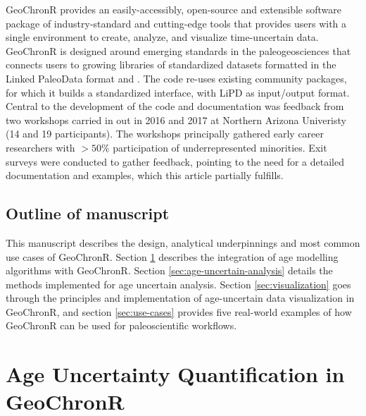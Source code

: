 \documentclass[gchron, manuscript]{copernicus}
\begin{document}
GeoChronR provides an easily-accessibly, open-source and extensible software package of industry-standard and cutting-edge tools that provides users with a single environment to create, analyze, and visualize time-uncertain data.
GeoChronR is designed around emerging standards in the paleogeosciences that connects users to growing libraries of standardized datasets formatted in the Linked PaleoData format \citep{LiPD} and \citep{neotoma}. The code re-uses existing community packages, for which it builds a standardized interface, with LiPD as input/output format. Central to the development of the code and documentation was feedback from two workshops carried in out in 2016 and 2017 at Northern Arizona Univeristy (14 and 19 participants). The workshops principally gathered early career researchers with \(>50\%\) participation of underrepresented minorities. Exit surveys were conducted to gather feedback, pointing to the need for a detailed documentation and examples, which this article partially fulfills.

\subsection{Outline of manuscript}

This manuscript describes the design, analytical underpinnings and most common use cases of GeoChronR.
Section \ref{sec:age-modeling} describes the integration of age modelling algorithms with GeoChronR.
Section \ref{sec:age-uncertain-analysis} details the methods implemented for age uncertain analysis.
Section \ref{sec:visualization} goes through the principles and implementation of age-uncertain data visualization in GeoChronR, and section \ref{sec:use-cases} provides five real-world examples of how GeoChronR can be used for paleoscientific workflows.

\hypertarget{sec:age-modeling}{%
\section{Age Uncertainty Quantification in GeoChronR}\label{sec:age-modeling}}
\end{document}

